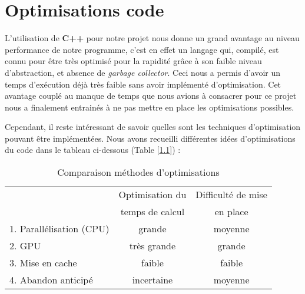 \chapter{Optimisations code}
\label{chapter-5}





L'utilisation de \textbf{C++} pour notre projet nous donne un grand avantage au niveau performance de notre programme, c'est en effet un langage qui, compilé, est connu pour être très optimisé pour la rapidité grâce à son faible niveau d'abstraction, et absence de \textit{garbage collector}. Ceci nous a permis d'avoir un temps d'exécution déjà très faible sans avoir implémenté d'optimisation. Cet avantage couplé au manque de temps que nous avions à consacrer pour ce projet nous a finalement entrainés à ne pas mettre en place les optimisations possibles.

Cependant, il reste intéressant de savoir quelles sont les techniques d'optimisation pouvant être implémentées. Nous avons recueilli différentes idées d'optimisations du code dans le tableau ci-dessous (Table [\ref{tab:optimisation-table}]) :

\begin{table}[h]
    \centering
    \begin{tabular}{|l|c|c|}
        \hline
         & Optimisation du & Difficulté de mise \\
         & temps de calcul & en place \\
         \hline
         1. Parallélisation (CPU) & grande & moyenne \\
         2. GPU & très grande & grande \\
         3. Mise en cache & faible & faible \\
         4. Abandon anticipé & incertaine & moyenne \\
         \hline
    \end{tabular}
    \caption{Comparaison méthodes d'optimisations}
    \label{tab:optimisation-table}
\end{table}

